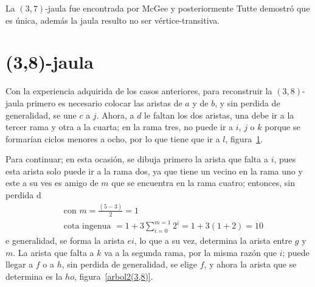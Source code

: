 \documentclass[12pt]{book}
\theoremstyle{definition}
\begin{document}
La $(3,7)$-jaula fue encontrada por McGee y posteriormente Tutte
demostró que es única, además la jaula resulto no ser
vértice-transitiva.


\section{(3,8)-jaula}

Con la experiencia adquirida de los casos anteriores, para reconstruir
la $(3,8)$-jaula primero es necesario colocar las aristas de $a$ y de
$b$, y sin perdida de generalidad, se une $c$ a $j$. Ahora, a $d$ le
faltan los dos aristas, una debe ir a la tercer rama y otra a la
cuarta; en la rama tres, no puede ir a $i$, $j$ o $k$ porque se
formarían ciclos menores a ocho, por lo que tiene que ir a $l$,
figura~\ref{arbol(3,8)}.

\begin{figure}
  \centering
  \caption{} \label{arbol(3,8)}
\end{figure}

Para continuar; en esta ocasión, se dibuja primero la arista que falta
a $i$, pues esta arista solo puede ir a la rama dos, ya que tiene un
vecino en la rama uno y este a su ves es amigo de $m$ que se encuentra
en la rama cuatro; entonces, sin perdida d\begin{equation*}
\begin{split}
  &\text{ con } m=\frac{(5-3)}{2}=1\\
 &\text{ cota ingenua }= 1 + 3\sum^{m=1}_{i=0} 2^i=1+3(1+2)=10
\end{split}
\end{equation*}e generalidad, se forma la
arista $ei$, lo que a su vez, determina la arista entre $g$ y $m$. La
arista que falta a $k$ va a la segunda rama, por la misma razón que
$i$; puede llegar a $f$ o a $h$, sin perdida de generalidad, se elige
$f$, y ahora la arista que se determina es la $ho$,
figura~\ref{arbol2(3,8)}.
\end{document}
